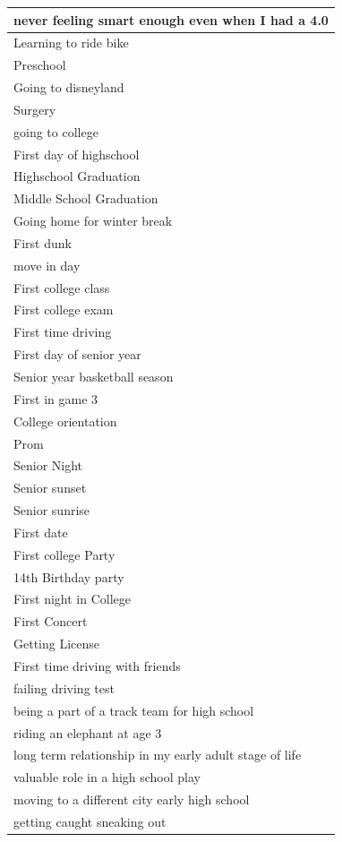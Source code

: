 \documentclass[
  .7em,
  letterpaper,
  DIV=11,
  numbers=noendperiod]{scrartcl}
\begin{document}
\begin{table}
\begin{tabular}{l}
\hline
never feeling smart enough even when I had a 4.0\\
\hline
Learning to ride bike\\
\hline
Preschool\\
\hline
Going to disneyland\\
\hline
Surgery\\
\hline
going to college\\
\hline
First day of highschool\\
\hline
Highschool Graduation\\
\hline
Middle School Graduation\\
\hline
Going home for winter break\\
\hline
First dunk\\
\hline
move in day\\
\hline
First college class\\
\hline
First college exam\\
\hline
First time driving\\
\hline
First day of senior year\\
\hline
Senior year basketball season\\
\hline
First in game 3\\
\hline
College orientation\\
\hline
Prom\\
\hline
Senior Night\\
\hline
Senior sunset\\
\hline
Senior sunrise\\
\hline
First date\\
\hline
First college Party\\
\hline
14th Birthday party\\
\hline
First night in College\\
\hline
First Concert\\
\hline
Getting License\\
\hline
First time driving with friends\\
\hline
failing driving test\\
\hline
being a part of a track team for high school\\
\hline
riding an elephant at age 3\\
\hline
long term relationship in my early adult stage of life\\
\hline
valuable role in a high school play\\
\hline
moving to a different city early high school\\
\hline
getting caught sneaking out\\

\end{tabular}
\end{table}
\end{document}
